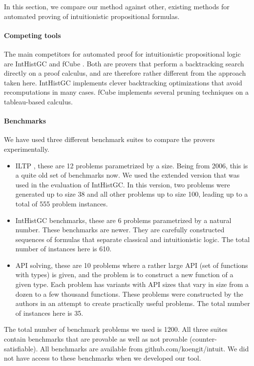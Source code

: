 \documentclass{llncs}
\begin{document}
In this section, we compare our method against other, existing methods for automated proving of intuitionistic propositional formulas.

\paragraph{Competing tools} The main competitors for automated proof for intuitionistic propositional logic are IntHistGC \cite{rajeev} and fCube \cite{fcube}. Both are provers that perform a backtracking search directly on a proof calculus, and are therefore rather different from the approach taken here. IntHistGC implements clever backtracking optimizations that avoid recomputations in many cases. fCube implements several pruning techniques on a tableau-based calculus.

\paragraph{Benchmarks} We have used three different benchmark suites to compare the provers experimentally.
\begin{itemize}
\item ILTP \cite{iltp}, these are 12 problems parametrized by a size. Being from 2006, this is a quite old set of benchmarks now. We used the extended version that was used in the evaluation of IntHistGC. In this version, two problems were generated up to size 38 and all other problems up to size 100, leading up to a total of 555 problem instances.
 
\item IntHistGC benchmarks, these are 6 problems parametrized by a natural number. These benchmarks are newer. They are carefully constructed sequences of formulas that separate classical and intuitionistic logic. The total number of instances here is 610.

\item API solving, these are 10 problems where a rather large API (set of functions with types) is given, and the problem is to construct a new function of a given type. Each problem has variants with API sizes that vary in size from a dozen to a few thousand functions. These problems were constructed by the authors in an attempt to create practically useful problems. The total number of instances here is 35.
\end{itemize}
The total number of benchmark problems we used is 1200. All three suites contain benchmarks that are provable as well as not provable (counter-satisfiable). All benchmarks are available from {\sf github.com/koengit/intuit}. We did not have access to these benchmarks when we developed our tool.
\end{document}
